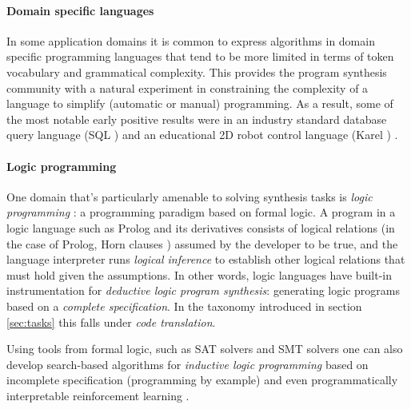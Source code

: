 \paragraph{Domain specific languages}

In some application domains it is common to express algorithms in domain specific programming languages \cite{fowlerDomainspecificLanguages2010, hudakDomainspecificLanguages1997, karsaiDesignGuidelinesDomain2014, kosarComparingGeneralpurposeDomainspecific2010, kosarDomainspecificLanguagesSystematic2016, mernikWhenHowDevelop2005} that tend to be more limited in terms of token vocabulary and grammatical complexity.
This provides the program synthesis community with a natural experiment in constraining the complexity of a language to simplify (automatic or manual) programming.
As a result, some of the most notable early positive results were in an industry standard database query language (SQL \cite{groffSQLCompleteReference2002}) \cite{liCanLlmAlready2024, yuSpiderLargescaleHumanlabeled2018} and an educational 2D robot control language (Karel \cite{pattisKarelRobotGentle1994}) \cite{metainduction}.

\paragraph{Logic programming}

One domain that's particularly amenable \cite{devilleLogicProgramSynthesis1994} to solving synthesis tasks is \emph{logic programming} \cite{doetsLogicLogicProgramming1994, lloydFoundationsLogicProgramming2012}: a programming paradigm \cite{floydParadigmsProgramming2007, gorodniaiaStudyProgrammingParadigms2016, krishnamurthi13ProgrammingParadigms2019, vanroyProgrammingParadigmsDummies2009} based on formal logic. 
A program in a logic language such as Prolog \cite{clocksinProgrammingPROLOG2003} and its derivatives consists of logical relations (in the case of Prolog, Horn clauses \cite{kowalskiPredicateLogicProgramming1974}) assumed by the developer to be true, and the language interpreter runs \emph{logical inference} to establish other logical relations that must hold given the assumptions.
In other words, logic languages have built-in instrumentation for \emph{deductive logic program synthesis}: generating logic programs based on a \emph{complete specification}.
In the taxonomy introduced in section \ref{sec:tasks} this falls under \emph{code translation}.

Using tools from formal logic, such as SAT solvers \cite{gongSurveySATSolver2017} and SMT solvers \cite{reynoldsInductionSMTSolvers2015,bjornerSmtSolversFoundations2016} one can also develop search-based algorithms for \emph{inductive logic programming} \cite{cropperInductiveLogicProgramming2022, muggletonInductiveLogicProgramming1994} based on incomplete specification (programming by example) and even programmatically interpretable reinforcement learning \cite{caoGALOISBoostingDeep}.

